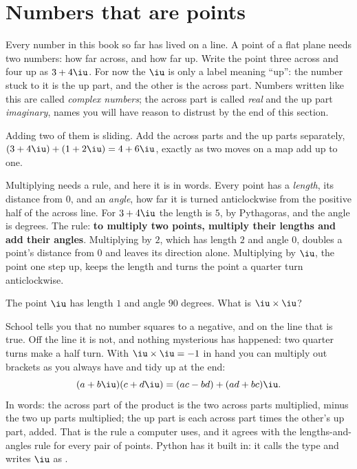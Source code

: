 \section{Numbers that are points}
\label{sec:ch12-plane}

\noindent
Every number in this book so far has lived on a line. A point of a flat
plane needs two numbers: how far across, and how far up. Write the point
three across and four up as $3 + 4\iu$. For now the $\iu$ is only a label
meaning \enquote{up}: the number stuck to it is the up part, and the other
is the across part. Numbers written like this are called \emph{complex
numbers}; the across part is called \emph{real} and the up part
\emph{imaginary}, names you will have reason to distrust by the end of this
section.

Adding two of them is sliding. Add the across parts and the up parts
separately, $(3 + 4\iu) + (1 + 2\iu) = 4 + 6\iu$, exactly as two moves on a
map add up to one.

Multiplying needs a rule, and here it is in words. Every point has a
\emph{length}, its distance from $0$, and an \emph{angle}, how far it is
turned anticlockwise from the positive half of the across line. For
$3 + 4\iu$ the length is $5$, by Pythagoras, and the angle is
 degrees. The rule: \textbf{to multiply two points,
multiply their lengths and add their angles}. Multiplying by $2$, which has
length $2$ and angle $0$, doubles a point's distance from $0$ and leaves its
direction alone. Multiplying by $\iu$, the point one step up, keeps the
length and turns the point a quarter turn anticlockwise.

\begin{think}
The point $\iu$ has length $1$ and angle $90$ degrees. What is
$\iu \times \iu$?
\end{think}
School tells you that no number squares to a negative, and on the line that
is true. Off the line it is not, and nothing mysterious has happened: two
quarter turns make a half turn. With $\iu \times \iu = -1$ in hand you can
multiply out brackets as you always have and tidy up at the end:
\[ (a + b\iu)(c + d\iu) = (ac - bd) + (ad + bc)\iu . \]
In words: the across part of the product is the two across parts
multiplied, minus the two up parts multiplied; the up part is each across
part times the other's up part, added. That is the rule a computer uses,
and it agrees with the lengths-and-angles rule for every pair of points.
Python has it built in: it calls the type  and writes $\iu$ as
.

